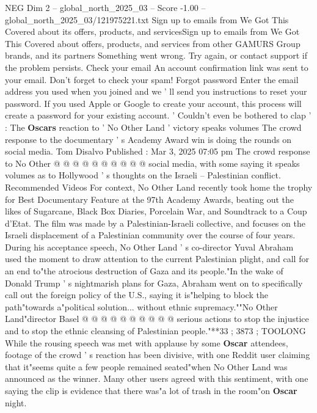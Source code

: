 \begin{textsample}{NEG Dim 2 – global\_north\_2025\_03 – Score -1.00 – global\_north\_2025\_03/121975221.txt}  \label{ex:f2_neg_028}
Sign up to emails from We Got This Covered about its offers, products, and servicesSign up to emails from We Got This Covered about offers, products, and services from other GAMURS Group brands, and its partners Something went wrong.
Try again, or contact support if the problem persists.
Check your email An account confirmation link was sent to your email.
Don't forget to check your spam!
Forgot password Enter the email address you used when you joined and we ' ll send you instructions to reset your password.
If you used Apple or Google to create your account, this process will create a password for your existing account. ' Couldn't even be bothered to clap ' : The \textbf{Oscars} reaction to ' No Other Land ' victory speaks volumes The crowd response to the documentary ' s Academy Award win is doing the rounds on social media.
Tom Disalvo Published : Mar 3, 2025 07:05 pm The crowd response to No Other @ @ @ @ @ @ @ @ @ @ social media, with some saying it speaks volumes as to Hollywood ' s thoughts on the Israeli -- Palestinian conflict.
Recommended Videos For context, No Other Land recently took home the trophy for Best Documentary Feature at the 97th Academy Awards, beating out the likes of Sugarcane, Black Box Diaries, Porcelain War, and Soundtrack to a Coup d'Etat.
The film was made by a Palestinian-Israeli collective, and focuses on the Israeli displacement of a Palestinian community over the course of four years.
During his acceptance speech, No Other Land ' s co-director Yuval Abraham used the moment to draw attention to the current Palestinian plight, and call for an end to"the atrocious destruction of Gaza and its people."In the wake of Donald Trump ' s nightmarish plans for Gaza, Abraham went on to specifically call out the foreign policy of the U.S., saying it is"helping to block the path"towards a"political solution... without ethnic supremacy.""No Other Land"director Basel @ @ @ @ @ @ @ @ @ @ serious actions to stop the injustice and to stop the ethnic cleansing of Palestinian people."**33 ; 3873 ; TOOLONG While the rousing speech was met with applause by some \textbf{Oscar} attendees, footage of the crowd ' s reaction has been divisive, with one Reddit user claiming that it"seems quite a few people remained seated"when No Other Land was announced as the winner.
Many other users agreed with this sentiment, with one saying the clip is evidence that there was"a lot of trash in the room"on \textbf{Oscar} night.

\end{textsample}
